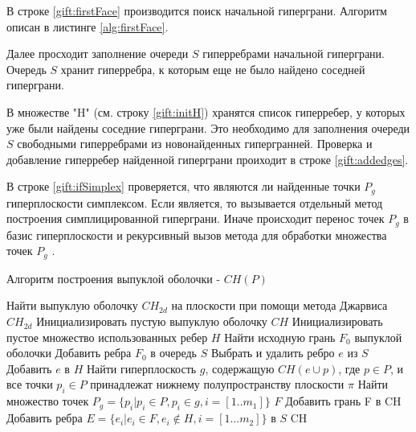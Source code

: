 \documentclass[a4paper,14pt]{extarticle}  %
\begin{document}
В строке \ref{gift:firstFace} производится поиск начальной гиперграни. Алгоритм описан в листинге \ref{alg:firstFace}.

Далее просходит заполнение очереди $S$ гиперребрами начальной гиперграни.
Очередь $S$ хранит гиперребра, к которым еще не было найдено соседней гиперграни.

В множестве "H" (см. строку \ref{gift:initH}) хранятся список гиперребер, у которых уже были найдены соседние гиперграни. Это необходимо для заполнения очереди $S$ свободными гиперребрами из новонайденных гипергранней. Проверка и добавление гиперребер найденной гиперграни проиходит в строке \ref{gift:addedges}.

В строке \ref{gift:ifSimplex} проверяется, что являются ли найденные точки $P_g$ гиперплоскости симплексом. Если является, то вызывается отдельный метод построения симплицированной гиперграни.
Иначе происходит перенос точек $P_g$ в базис гиперплоскости и рекурсивный вызов метода для обработки множества точек $P_g$ .


\begin{algorithm*}[H]
    \caption{Алгоритм построения выпуклой оболочки - $CH(P)$}
    \label{alg:gift}
    \DontPrintSemicolon
    {
        Найти выпуклую оболочку $CH_{2d}$ на плоскости при помощи метода Джарвиса\;
        \Return $CH_{2d}$\;
    }
    Инициализировать пустую выпуклую оболочку $CH$\;
    Инициализировать пустое множество использованных ребер $H$ \label{gift:initH}\;
    Найти исходную грань $F_0$ выпуклой оболочки\label{gift:firstFace}\;
    Добавить ребра $F_0$ в очередь $S$\;
    {
        Выбрать и удалить ребро $e$ из $S$\;
        Добавить $e$ в $H$\;
        Найти гиперплоскость $g$, содержащую
        $CH ( e \cup p )$, где $ p \in P$, и все точки  $p_i \in P$ принадлежат нижнему полупространству плоскости $\pi$\;
        Найти множество точек $P_g = \{p_i|p_i\in P, p_i \in g, i=\left[1.. m_1\right]\}$ \label{gift:findFace}\;
        {
            \Return $F$\;
        }
        Добавить грань F в CH\;
        Добавить ребра $E=\{e_i |e_i \in F, e_i \notin H, i = \left[ 1\ldots m_2\right]\}$ в $S$\; \label{gift:addedges}
    }
    \Return CH
\end{algorithm*}
\end{document}
